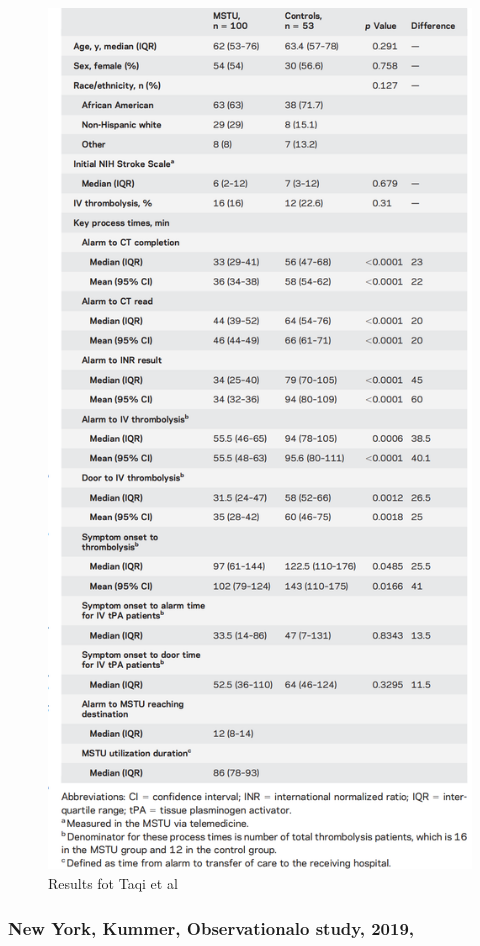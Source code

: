 \begin{figure}
    \centering
    \includegraphics[width=0.65\linewidth]{images_background/taqi_2017.png}
    \caption{Results fot Taqi et al \cite{taqui_reduction_2017}}
    \label{fig:taqi_2017}
\end{figure}

\subsubsection{New York, Kummer, Observationalo study, 2019, \cite{kummer_geographic_2019}}

